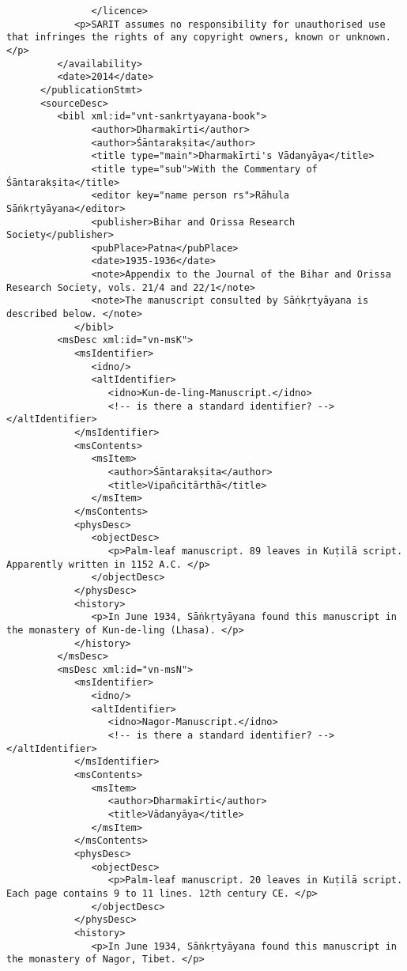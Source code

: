 \documentclass[article,12pt,a4paper]{memoir}%
\begin{document}
\begin{verbatim}
	           </licence>
            <p>SARIT assumes no responsibility for unauthorised use that infringes the rights of any copyright owners, known or unknown. </p>
         </availability>
         <date>2014</date>
      </publicationStmt>
      <sourceDesc>
         <bibl xml:id="vnt-sankrtyayana-book">
	           <author>Dharmakīrti</author>
	           <author>Śāntarakṣita</author>
	           <title type="main">Dharmakīrti's Vādanyāya</title>
	           <title type="sub">With the Commentary of Śāntarakṣita</title>
	           <editor key="name person rs">Rāhula Sāṅkṛtyāyana</editor>
	           <publisher>Bihar and Orissa Research Society</publisher>
	           <pubPlace>Patna</pubPlace>
	           <date>1935-1936</date>
	           <note>Appendix to the Journal of the Bihar and Orissa Research Society, vols. 21/4 and 22/1</note>
	           <note>The manuscript consulted by Sāṅkṛtyāyana is described below. </note>
	        </bibl>
         <msDesc xml:id="vn-msK">
            <msIdentifier>
               <idno/>
               <altIdentifier>
                  <idno>Kun-de-ling-Manuscript.</idno>
                  <!-- is there a standard identifier? --></altIdentifier>
            </msIdentifier>
            <msContents>
               <msItem>
                  <author>Śāntarakṣita</author>
                  <title>Vipañcitārthā</title>
               </msItem>
            </msContents>
            <physDesc>
               <objectDesc>
                  <p>Palm-leaf manuscript. 89 leaves in Kuṭilā script. Apparently written in 1152 A.C. </p>
               </objectDesc>
            </physDesc>
            <history>
               <p>In June 1934, Sāṅkṛtyāyana found this manuscript in the monastery of Kun-de-ling (Lhasa). </p>
            </history>
         </msDesc>
         <msDesc xml:id="vn-msN">
            <msIdentifier>
               <idno/>
               <altIdentifier>
                  <idno>Nagor-Manuscript.</idno>
                  <!-- is there a standard identifier? --></altIdentifier>
            </msIdentifier>
            <msContents>
               <msItem>
                  <author>Dharmakīrti</author>
                  <title>Vādanyāya</title>
               </msItem>
            </msContents>
            <physDesc>
               <objectDesc>
                  <p>Palm-leaf manuscript. 20 leaves in Kuṭilā script. Each page contains 9 to 11 lines. 12th century CE. </p>
               </objectDesc>
            </physDesc>
            <history>
               <p>In June 1934, Sāṅkṛtyāyana found this manuscript in the monastery of Nagor, Tibet. </p>

\end{verbatim}
\end{document}

